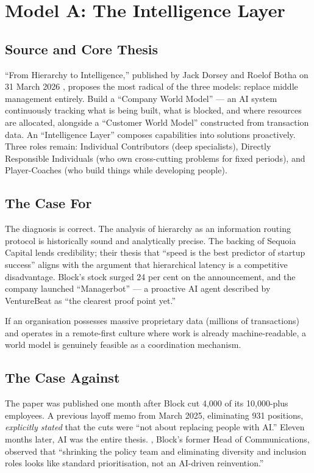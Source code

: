 \section{Model A: The Intelligence Layer}

\subsection{Source and Core Thesis}

``From Hierarchy to Intelligence,'' published by Jack Dorsey and Roelof Botha on 31 March 2026 \parencite{DorseyBotha2026}, proposes the most radical of the three models: replace middle management entirely. Build a ``Company World Model'' --- an AI system continuously tracking what is being built, what is blocked, and where resources are allocated, alongside a ``Customer World Model'' constructed from transaction data. An ``Intelligence Layer'' composes capabilities into solutions proactively. Three roles remain: Individual Contributors (deep specialists), Directly Responsible Individuals (who own cross-cutting problems for fixed periods), and Player-Coaches (who build things while developing people).

\subsection{The Case For}

The diagnosis is correct. The analysis of hierarchy as an information routing protocol is historically sound and analytically precise. The backing of Sequoia Capital lends credibility; their thesis that ``speed is the best predictor of startup success'' aligns with the argument that hierarchical latency is a competitive disadvantage. Block's stock surged 24 per cent on the announcement, and the company launched ``Managerbot'' --- a proactive AI agent described by VentureBeat as ``the clearest proof point yet.''

If an organisation possesses massive proprietary data (millions of transactions) and operates in a remote-first culture where work is already machine-readable, a world model is genuinely feasible as a coordination mechanism.

\subsection{The Case Against}

The paper was published one month after Block cut 4,000 of its 10,000-plus employees. A previous layoff memo from March 2025, eliminating 931 positions, \emph{explicitly stated} that the cuts were ``not about replacing people with AI.'' Eleven months later, AI was the entire thesis. \textcite{Zamost2026}, Block's former Head of Communications, observed that ``shrinking the policy team and eliminating diversity and inclusion roles looks like standard prioritisation, not an AI-driven reinvention.''

